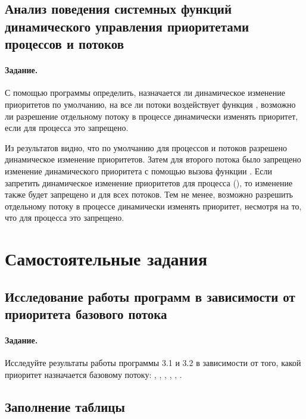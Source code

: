 \subsection{Анализ поведения системных функций динамического управления приоритетами процессов и потоков}

\paragraph{Задание.} С помощью программы определить, назначается ли динамическое изменение приоритетов по умолчанию, на все ли потоки воздействует функция , возможно ли разрешение отдельному потоку в процессе динамически изменять приоритет, если для процесса это запрещено.


Из результатов видно, что по умолчанию для процессов и потоков разрешено динамическое изменение приоритетов. Затем для второго потока было запрещено изменение динамического приоритета с помощью вызова функции . Если запретить динамическое изменение приоритетов для процесса (), то изменение также будет запрещено и для всех потоков. Тем не менее, возможно разрешить отдельному потоку в процессе динамически изменять приоритет, несмотря на то, что для процесса это запрещено.

\newpage

\section{Самостоятельные задания}

\subsection{Исследование работы программ в зависимости от приоритета базового потока}

\paragraph{Задание.} Исследуйте результаты работы программы 3.1 и 3.2 в зависимости от того, какой приоритет назначается базовому потоку: , , , , , .

\subsection{Заполнение таблицы }

